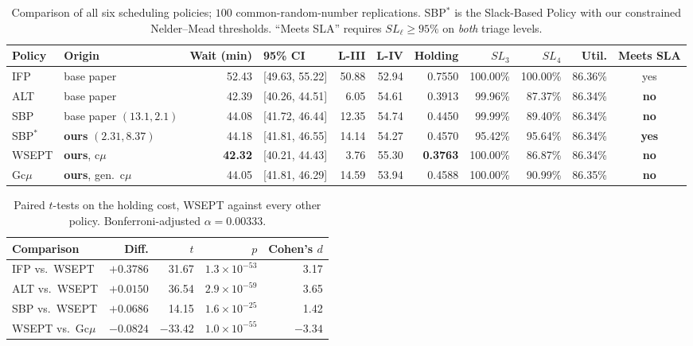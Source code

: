 \documentclass[sigconf,nonacm]{acmart}
\newcommand{\best}[1]{\textbf{#1}}
\begin{document}
\begin{table}[t]
\caption{Comparison of all six scheduling policies; $100$ common-random-number
         replications. SBP$^{*}$ is the Slack-Based Policy with our constrained
         Nelder--Mead thresholds. ``Meets SLA'' requires $SL_\ell\ge95\%$ on
         \emph{both} triage levels.}
\label{tab:master}
\begin{tabular}{@{}llrlrrrrrrc@{}}
\toprule
\textbf{Policy} & \textbf{Origin} & \textbf{Wait (min)} & \textbf{95\% CI} &
\textbf{L-III} & \textbf{L-IV} & \textbf{Holding} &
\textbf{$SL_3$} & \textbf{$SL_4$} & \textbf{Util.} & \textbf{Meets SLA} \\
\midrule
IFP    & base paper                & 52.43 & [49.63, 55.22] & 50.88 & 52.94 & 0.7550 & 100.00\% & 100.00\% & 86.36\% & yes \\
ALT    & base paper                & 42.39 & [40.26, 44.51] & 6.05  & 54.61 & 0.3913 & 99.96\%  & 87.37\%  & 86.34\% & \textbf{no} \\
SBP    & base paper $(13.1,2.1)$   & 44.08 & [41.72, 46.44] & 12.35 & 54.74 & 0.4450 & 99.99\%  & 89.40\%  & 86.34\% & \textbf{no} \\
SBP$^{*}$ & \textbf{ours} $(2.31,8.37)$ & 44.18 & [41.81, 46.55] & 14.14 & 54.27 & 0.4570 & 95.42\%  & 95.64\%  & 86.34\% & \best{yes} \\
WSEPT  & \textbf{ours}, c$\mu$     & \best{42.32} & [40.21, 44.43] & 3.76 & 55.30 & \best{0.3763} & 100.00\% & 86.87\% & 86.34\% & \textbf{no} \\
Gc$\mu$& \textbf{ours}, gen.\ c$\mu$ & 44.05 & [41.81, 46.29] & 14.59 & 53.94 & 0.4588 & 100.00\% & 90.99\%  & 86.35\% & \textbf{no} \\
\bottomrule
\end{tabular}
\end{table}

\begin{table}[t]
\caption{Paired $t$-tests on the holding cost, WSEPT against every other
         policy. Bonferroni-adjusted $\alpha = 0.00333$.}
\label{tab:cmusig}
\small
\begin{tabular}{@{}lrrrr@{}}
\toprule
\textbf{Comparison} & \textbf{Diff.} & $t$ & $p$ & \textbf{Cohen's $d$} \\
\midrule
IFP vs.\ WSEPT    & $+0.3786$ & 31.67  & $1.3\!\times\!10^{-53}$ & 3.17 \\
ALT vs.\ WSEPT    & $+0.0150$ & 36.54  & $2.9\!\times\!10^{-59}$ & 3.65 \\
SBP vs.\ WSEPT    & $+0.0686$ & 14.15  & $1.6\!\times\!10^{-25}$ & 1.42 \\
WSEPT vs.\ Gc$\mu$& $-0.0824$ & $-33.42$ & $1.0\!\times\!10^{-55}$ & $-3.34$ \\
\bottomrule
\end{tabular}
\end{table}
\end{document}

